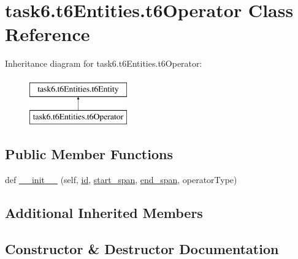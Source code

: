 \hypertarget{classtask6_1_1t6Entities_1_1t6Operator}{}\section{task6.\+t6\+Entities.\+t6\+Operator Class Reference}
\label{classtask6_1_1t6Entities_1_1t6Operator}
Inheritance diagram for task6.\+t6\+Entities.\+t6\+Operator\+:\begin{figure}[H]
\begin{center}
\leavevmode
\includegraphics[height=2.000000cm]{classtask6_1_1t6Entities_1_1t6Operator}
\end{center}
\end{figure}
\subsection*{Public Member Functions}
\begin{DoxyCompactItemize}
\item 
def \hyperlink{classtask6_1_1t6Entities_1_1t6Operator_a742bafc1cb775d74ee2be13f8c880472}{\+\_\+\+\_\+init\+\_\+\+\_\+} (self, \hyperlink{classtask6_1_1t6Entities_1_1t6Entity_a96b2e7fb553c920ab2db6f6deb31e3b4}{id}, \hyperlink{classtask6_1_1t6Entities_1_1t6Entity_a8221c36d2995a24200cdfbd74cc9233c}{start\+\_\+span}, \hyperlink{classtask6_1_1t6Entities_1_1t6Entity_a597d42bb02fc9f42277098f0ce21917c}{end\+\_\+span}, operator\+Type)
\end{DoxyCompactItemize}
\subsection*{Additional Inherited Members}


\subsection{Constructor \& Destructor Documentation}
\mbox{\label{classtask6_1_1t6Entities_1_1t6Operator_a742bafc1cb775d74ee2be13f8c880472}} 
